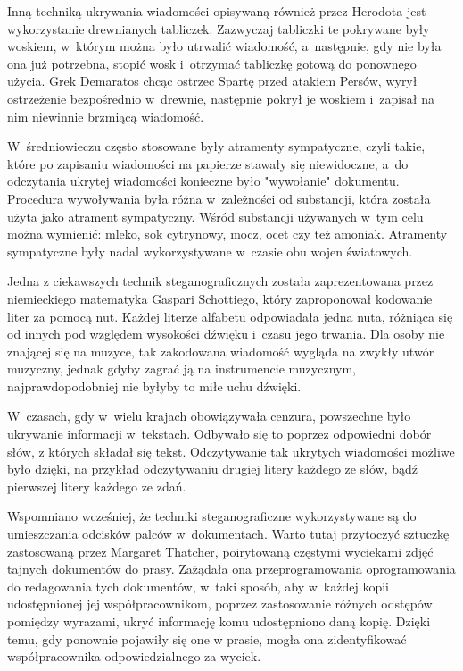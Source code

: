 \documentclass[a4paper, twoside, 12pt]{report}
\begin{document}
        Inną techniką ukrywania wiadomości opisywaną również przez Herodota
        jest wykorzystanie drewnianych tabliczek. Zazwyczaj tabliczki te pokrywane
        były woskiem, w~którym można było utrwalić wiadomość, a~następnie, gdy
        nie była ona już potrzebna, stopić wosk i~otrzymać tabliczkę gotową do
        ponownego użycia. Grek Demaratos chcąc ostrzec Spartę przed atakiem Persów,
        wyrył ostrzeżenie bezpośrednio w~drewnie, następnie pokrył je woskiem
        i~zapisał na nim niewinnie brzmiącą wiadomość.

        W~średniowieczu często stosowane były atramenty sympatyczne, czyli takie,
        które po zapisaniu wiadomości na papierze stawały się niewidoczne, a~do
        odczytania ukrytej wiadomości konieczne było "wywołanie" dokumentu. Procedura
        wywoływania była różna w~zależności od substancji, która została użyta jako
        atrament sympatyczny. Wśród substancji używanych w~tym celu można wymienić:
        mleko, sok cytrynowy, mocz, ocet czy też amoniak. Atramenty sympatyczne
        były nadal wykorzystywane w~czasie obu wojen światowych.

        Jedna z ciekawszych technik steganograficznych została zaprezentowana przez
        niemieckiego matematyka Gaspari Schottiego\cite{NUTYSTEGANOGRAFIA},
        który zaproponował kodowanie liter za pomocą nut. Każdej literze alfabetu
        odpowiadała jedna nuta, różniąca się od innych pod względem wysokości
        dźwięku i~czasu jego trwania. Dla osoby nie znającej się na muzyce, tak zakodowana
        wiadomość wygląda na zwykły utwór muzyczny, jednak gdyby zagrać ją na instrumencie
        muzycznym, najprawdopodobniej nie byłyby to miłe uchu dźwięki.

        W~czasach, gdy w~wielu krajach obowiązywała cenzura, powszechne było ukrywanie
        informacji w~tekstach. Odbywało się to poprzez odpowiedni dobór słów,
        z których składał się tekst. Odczytywanie tak ukrytych wiadomości możliwe było
        dzięki, na przykład odczytywaniu drugiej litery każdego ze słów, bądź pierwszej
        litery każdego ze zdań.

        Wspomniano wcześniej, że techniki steganograficzne wykorzystywane są do umieszczania
        odcisków palców w~dokumentach. Warto tutaj przytoczyć sztuczkę zastosowaną
        przez Margaret Thatcher, poirytowaną częstymi wyciekami zdjęć tajnych dokumentów
        do prasy. Zażądała ona przeprogramowania oprogramowania do redagowania tych
        dokumentów, w~taki sposób, aby w~każdej kopii udostępnionej jej współpracownikom,
        poprzez zastosowanie różnych odstępów pomiędzy wyrazami, ukryć informację
        komu udostępniono daną kopię. Dzięki temu, gdy ponownie pojawiły się one w
        prasie, mogła ona zidentyfikować współpracownika odpowiedzialnego za wyciek.\cite{DIGITALWATERMARKING}
\end{document}
